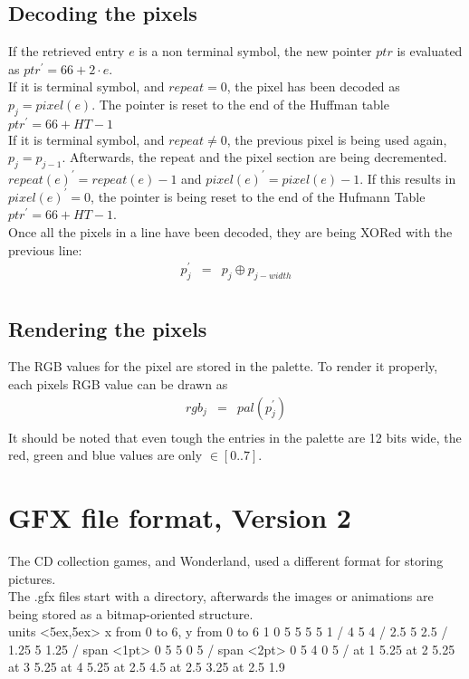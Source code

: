 \documentclass[11pt,twoside,openright]{report}
\begin{document}
\subsection{Decoding the pixels}
If the retrieved entry $e$ is a non terminal symbol, the new pointer $ptr$ is evaluated as $ptr^\prime=66+2\cdot e$.\\
If it is terminal symbol, and $repeat=0$, the pixel has been decoded as $p_j=pixel(e)$. The pointer is reset to the end of the Huffman table $ptr^\prime=66+HT-1$\\
If it is terminal symbol, and $repeat\ne 0$, the previous pixel is being used again, $p_j=p_{j-1}$. Afterwards, the repeat and the pixel section are being decremented. $repeat(e)^\prime=repeat(e)-1$ and $pixel(e)^\prime=pixel(e)-1$. If this results in $pixel(e)^\prime=0$, the pointer is being reset to the end of the Hufmann Table $ptr^\prime=66+HT-1$.\\

Once all the pixels in a line have been decoded, they are being XORed with the previous line:
\begin{eqnarray*}
p_j^\prime&=&p_j\oplus p_{j-width}\\
\end{eqnarray*}
\subsection{Rendering the pixels}
The RGB values for the pixel are stored in the palette. To render it properly, each pixels RGB value can be drawn as 
\begin{eqnarray*}
rgb_j&=&pal(p_j^\prime)\\
\end{eqnarray*}
It should be noted that even tough the entries in the palette are 12 bits wide, the red, green and blue values are only $\in\left[0..7\right]$.\\
\section{GFX file format, Version 2}
The CD collection games, and Wonderland, used a different format for storing pictures.\\
The .gfx files start with a directory, afterwards the images or animations are being stored as a bitmap-oriented structure.\\

\beginpicture
\setcoordinatesystem units <5ex,5ex>
\setplotarea x from 0 to 6, y from 0 to 6
 1 0 5 5 5 5 1 /
 4 5 4 /
 2.5 5 2.5 /
 1.25 5 1.25 /
\setshadegrid span <1pt>
 0 5 5 0 5 /
\setshadegrid span <2pt>
 0 5 4 0 5 /
 at 1 5.25
 at 2 5.25
 at 3 5.25
 at 4 5.25
 at 2.5 4.5
 at 2.5 3.25
 at 2.5 1.9
\end{document}
